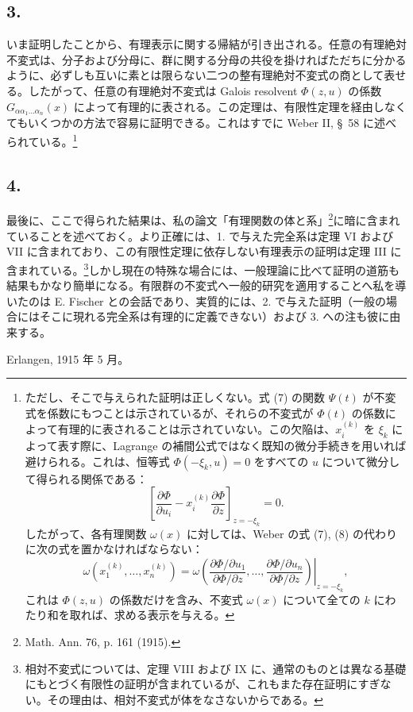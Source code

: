 \subsection*{3.}
いま証明したことから、有理表示に関する帰結が引き出される。任意の有理絶対不変式は、分子および分母に、群に関する分母の共役を掛ければただちに分かるように、必ずしも互いに素とは限らない二つの整有理絶対不変式の商として表せる。したがって、任意の有理絶対不変式は Galois resolvent $\Phi(z,u)$ の係数 $G_{\alpha\alpha_1\ldots\alpha_n}(x)$ によって有理的に表される。この定理は、有限性定理を経由しなくてもいくつかの方法で容易に証明できる。これはすでに Weber II, \S\ 58 に述べられている。\footnote{ただし、そこで与えられた証明は正しくない。式 (7) の関数 $\Psi(t)$ が不変式を係数にもつことは示されているが、それらの不変式が $\Phi(t)$ の係数によって有理的に表されることは示されていない。この欠陥は、$x_i^{(k)}$ を $\xi_k$ によって表す際に、Lagrange の補間公式ではなく既知の微分手続きを用いれば避けられる。これは、恒等式 $\Phi(-\xi_k,u)=0$ をすべての $u$ について微分して得られる関係である：
\[
 \left[\frac{\partial\Phi}{\partial u_i}
      -x_i^{(k)}\frac{\partial\Phi}{\partial z}\right]_{z=-\xi_k}=0.
\]
したがって、各有理関数 $\omega(x)$ に対しては、Weber の式 (7), (8) の代わりに次の式を置かなければならない：
\[
 \omega(x_1^{(k)},\ldots,x_n^{(k)})=
 \left.
 \omega\!\left(
   \frac{\partial\Phi/\partial u_1}{\partial\Phi/\partial z},\ldots,
   \frac{\partial\Phi/\partial u_n}{\partial\Phi/\partial z}
 \right)\right|_{z=-\xi_k},
\]
これは $\Phi(z,u)$ の係数だけを含み、不変式 $\omega(x)$ について全ての $k$ にわたり和を取れば、求める表示を与える。}

\subsection*{4.}
最後に、ここで得られた結果は、私の論文「有理関数の体と系」\footnote{Math. Ann. 76, p. 161 (1915).}に暗に含まれていることを述べておく。より正確には、1. で与えた完全系は定理 VI および VII に含まれており、この有限性定理に依存しない有理表示の証明は定理 III に含まれている。\footnote{相対不変式については、定理 VIII および IX に、通常のものとは異なる基礎にもとづく有限性の証明が含まれているが、これもまた存在証明にすぎない。その理由は、相対不変式が体をなさないからである。}しかし現在の特殊な場合には、一般理論に比べて証明の道筋も結果もかなり簡単になる。有限群の不変式へ一般的研究を適用することへ私を導いたのは E. Fischer との会話であり、実質的には、2. で与えた証明（一般の場合にはそこに現れる完全系は有理的に定義できない）および 3. への注も彼に由来する。

Erlangen, 1915 年 5 月。

\clearpage
